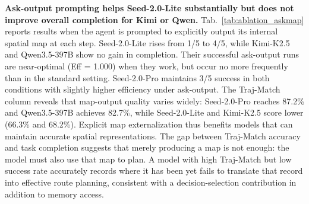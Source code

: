 \noindent\textbf{Ask-output prompting helps Seed-2.0-Lite substantially but does not improve overall completion for Kimi or Qwen.}\label{sec:appendix_askmap}
Tab.~\ref{tab:ablation_askmap} reports results when the agent is prompted to explicitly output its internal spatial map at each step. Seed-2.0-Lite rises from 1/5 to 4/5, while Kimi-K2.5 and Qwen3.5-397B show no gain in completion. Their successful ask-output runs are near-optimal (Eff = 1.000) when they work, but occur no more frequently than in the standard setting. Seed-2.0-Pro maintains 3/5 success in both conditions with slightly higher efficiency under ask-output. The Traj-Match column reveals that map-output quality varies widely: Seed-2.0-Pro reaches 87.2\% and Qwen3.5-397B achieves 82.7\%, while Seed-2.0-Lite and Kimi-K2.5 score lower (66.3\% and 68.2\%). Explicit map externalization thus benefits models that can maintain accurate spatial representations. The gap between Traj-Match accuracy and task completion suggests that merely producing a map is not enough: the model must also use that map to plan. A model with high Traj-Match but low success rate accurately records where it has been yet fails to translate that record into effective route planning, consistent with a decision-selection contribution in addition to memory access.


